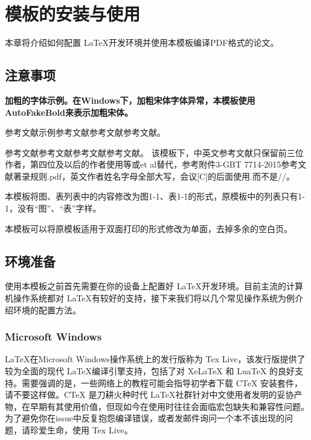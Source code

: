 \chapter{模板的安装与使用}
\label{chp:installation}

本章将介绍如何配置 \LaTeX 开发环境并使用本模板编译PDF格式的论文。

\section{注意事项}

\textbf{加粗的字体示例。在Windows下，加粗宋体字体异常，本模板使用AutoFakeBold来表示加粗宋体。}

参考文献示例\cite{JSJX202411005}参考文献\citet{JSJX202411005}参考文献参考文献。

参考文献\cite{tseng2021codedbulk}参考文献\citet{tseng2021codedbulk}参考文献参考文献。
该模板下，中英文参考文献只保留前三位作者，第四位及以后的作者使用等或et al替代，参考附件3-GBT 7714-2015参考文献著录规则.pdf，英文作者姓名字母全部大写，会议[C]的后面使用.而不是//。

本模板将图、表列表中的内容修改为图1-1、表1-1的形式，原模板中的列表只有1-1，没有“图”、“表”字样。

本模板可以将原模板适用于双面打印的形式修改为单面，去掉多余的空白页。

\section{环境准备}
\label{sec:tex_environment}

使用本模板之前首先需要在你的设备上配置好 \LaTeX 开发环境。目前主流的计算机操作系统都对 \LaTeX 有较好的支持，接下来我们将以几个常见操作系统为例介绍环境的配置方法。

\subsection{Microsoft Windows\texttrademark}

\LaTeX 在Microsoft Windows操作系统上的发行版称为 Tex Live，该发行版提供了较为全面的现代 \LaTeX 编译引擎支持，包括了对 XeLaTeX 和 LuaTeX 的良好支持。需要强调的是，一些网络上的教程可能会指导初学者下载 CTeX 安装套件，请不要这样做。CTeX 是刀耕火种时代 \LaTeX 社群针对中文使用者发明的妥协产物，在早期有其使用价值，但现如今在使用时往往会面临宏包缺失和兼容性问题\cite{muzi2020ctex}。为了避免你在issue中反复抱怨编译错误，或者发邮件询问一个本不该出现的问题，请珍爱生命，使用 Tex Live。

